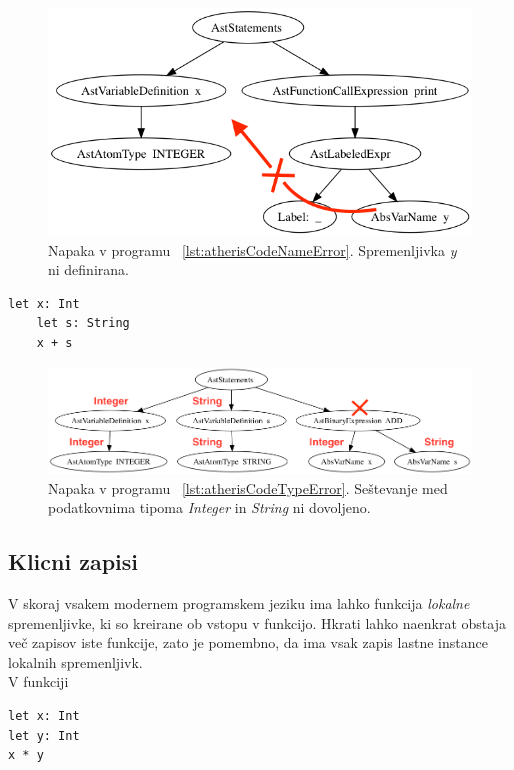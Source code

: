 \documentclass[a4paper, 12pt]{book}
\begin{document}
\begin{figure}[h]
	\begin{center}
		\includegraphics[width=1\textwidth]{resources/astSemanNameError.png}
	\end{center}
	\caption{Napaka v programu ~\ref{lst:atherisCodeNameError}. Spremenljivka \textit{y} ni definirana.}
	\label{image:astSemanCodeNameError}
\end{figure}

\begin{lstlisting}[caption={Primer programa, kjer je napaka v podatkovnih tipih},label={lst:atherisCodeTypeError},captionpos=b]
	let x: Int
	let s: String
	x + s
\end{lstlisting}

\begin{figure}[h]
	\begin{center}
		\includegraphics[width=1\textwidth]{resources/astSemanTypeError.png}
	\end{center}
	\caption{Napaka v programu ~\ref{lst:atherisCodeTypeError}. Seštevanje med podatkovnima tipoma \textit{Integer} in \textit{String} ni dovoljeno.}
	\label{image:astSemanTypeError}
\end{figure}

\subsection{Klicni zapisi}

V skoraj vsakem modernem programskem jeziku ima lahko funkcija \textit{lokalne} spremenljivke, ki so kreirane ob vstopu v funkcijo. Hkrati lahko naenkrat obstaja več zapisov iste funkcije, zato je pomembno, da ima vsak zapis lastne instance lokalnih spremenljivk. \cite{modernCompiler} \\
\indent V funkciji 
\begin{lstlisting}
let x: Int
let y: Int
x * y
\end{lstlisting}
\end{document}
